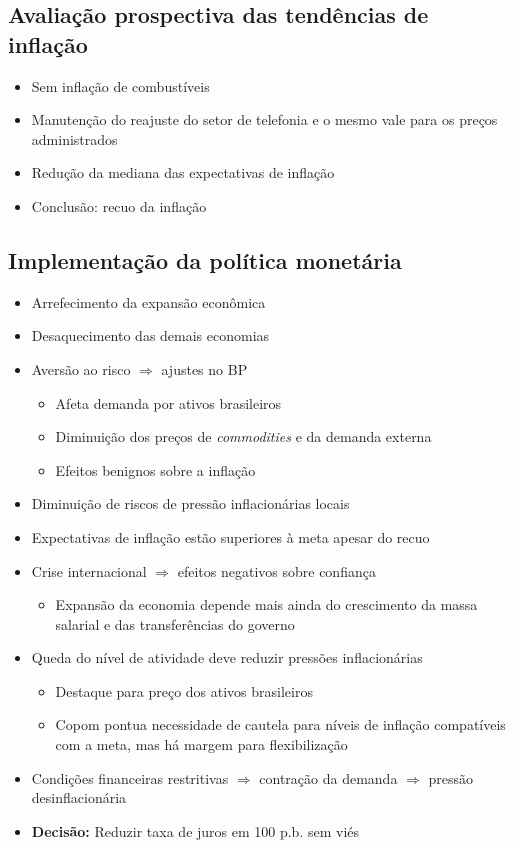 \documentclass[11pt]{article}
\begin{document}
\subsection*{Avaliação prospectiva das tendências de inflação}
\label{sec:orgf78dab1}
\begin{itemize}
\item Sem inflação de combustíveis
\item Manutenção do reajuste do setor de telefonia e o mesmo vale para os preços administrados
\item Redução da mediana das expectativas de inflação
\item Conclusão: recuo da inflação
\end{itemize}
\subsection*{Implementação da política monetária}
\label{sec:org060117e}
\begin{itemize}
\item Arrefecimento da expansão econômica
\item Desaquecimento das demais economias
\item Aversão ao risco \(\Rightarrow\) ajustes no BP
\begin{itemize}
\item Afeta demanda por ativos brasileiros
\item Diminuição dos preços de \emph{commodities} e da demanda externa
\item Efeitos benignos sobre a inflação
\end{itemize}
\item Diminuição de riscos de pressão inflacionárias locais
\item Expectativas de inflação estão superiores à meta apesar do recuo
\item Crise internacional \(\Rightarrow\) efeitos negativos sobre confiança
\begin{itemize}
\item Expansão da economia depende mais ainda do crescimento da massa salarial e das transferências do governo
\end{itemize}
\item Queda do nível de atividade deve reduzir pressões inflacionárias
\begin{itemize}
\item Destaque para preço dos ativos brasileiros
\item Copom pontua necessidade de cautela para níveis de inflação compatíveis com a meta, mas há margem para flexibilização
\end{itemize}
\item Condições financeiras restritivas \(\Rightarrow\) contração da demanda \(\Rightarrow\) pressão desinflacionária
\item \textbf{Decisão:} Reduzir taxa de juros em 100 p.b. sem viés
\end{itemize}
\end{document}
